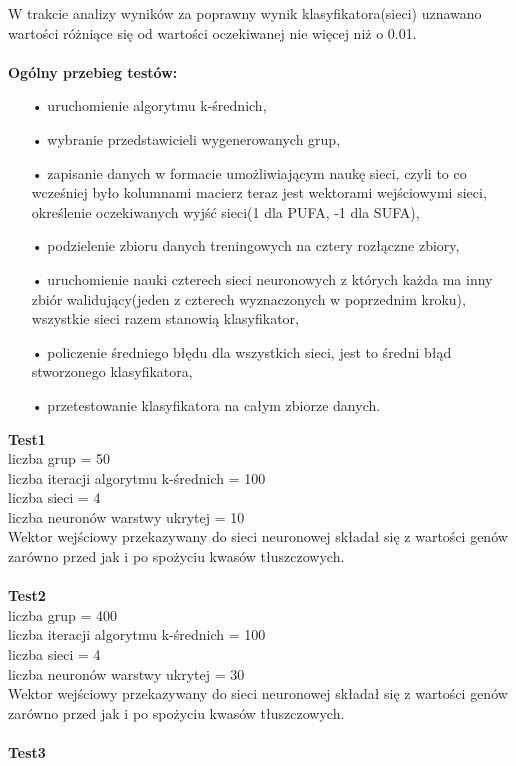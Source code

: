 \documentclass{classrep}
\begin{document}
W trakcie analizy wyników za poprawny wynik klasyfikatora(sieci) uznawano wartości różniące się od wartości oczekiwanej nie więcej niż o 0.01.\\\\
\textbf{Ogólny przebieg testów:}
\begin{itemize}
\item[•] uruchomienie algorytmu k-średnich,
\item[•] wybranie przedstawicieli wygenerowanych grup,
\item[•] zapisanie danych w formacie umożliwiającym naukę sieci, czyli to co wcześniej było kolumnami macierz teraz jest wektorami wejściowymi sieci, określenie oczekiwanych wyjść sieci(1 dla PUFA, -1 dla SUFA),
\item[•] podzielenie zbioru danych treningowych na cztery rozłączne zbiory,
\item[•] uruchomienie nauki czterech sieci neuronowych z których każda ma inny zbiór walidujący(jeden z czterech wyznaczonych w poprzednim kroku), wszystkie sieci razem stanowią klasyfikator,
\item[•] policzenie średniego błędu dla wszystkich sieci, jest to średni błąd stworzonego klasyfikatora,
\item[•] przetestowanie klasyfikatora na całym zbiorze danych.\\
\end{itemize}
\textbf{Test1}\\
liczba grup = 50\\
liczba iteracji algorytmu k-średnich = 100\\
liczba sieci = 4\\
liczba neuronów warstwy ukrytej = 10\\
Wektor wejściowy przekazywany do sieci neuronowej składał się z wartości genów zarówno przed jak i po spożyciu kwasów tłuszczowych.\\\\
\textbf{Test2}\\
liczba grup = 400\\
liczba iteracji algorytmu k-średnich = 100\\
liczba sieci = 4\\
liczba neuronów warstwy ukrytej = 30\\
Wektor wejściowy przekazywany do sieci neuronowej składał się z wartości genów zarówno przed jak i po spożyciu kwasów tłuszczowych.\\\\
\textbf{Test3}\\
\end{document}
